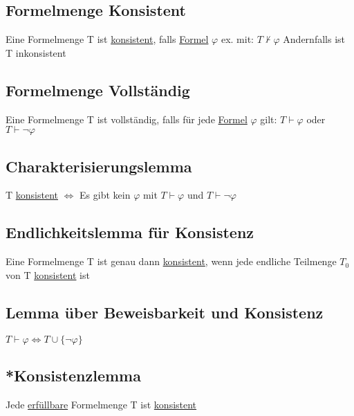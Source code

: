 \documentclass[12pt,a4paper]{article} %
\begin{document}
	\subsection{Formelmenge Konsistent}
	Eine Formelmenge T ist \hyperref[ALKonsistent]{konsistent}, falls \hyperref[Formel]{Formel} $\varphi$ ex. mit: $T \nvdash \varphi$ Andernfalls ist T inkonsistent
	
	\subsection{Formelmenge Vollständig}
	Eine Formelmenge T ist vollständig, falls für jede \hyperref[Formel]{Formel} $\varphi$ gilt: $T \hyperref[Beweisbar]{\vdash} \varphi$ oder $T \hyperref[Beweisbar]{\vdash} \neg \varphi$
	
	\subsection{Charakterisierungslemma}
	T \hyperref[ALKonsistent]{konsistent} $\Leftrightarrow$ Es gibt kein $\varphi$ mit $T \hyperref[Beweisbar]{\vdash} \varphi$ und $T \hyperref[Beweisbar]{\vdash} \neg \varphi$
	
	\subsection{Endlichkeitslemma für Konsistenz}
	Eine Formelmenge T ist genau dann \hyperref[ALKonsistent]{konsistent}, wenn jede endliche Teilmenge $T_0$ von T \hyperref[ALKonsistent]{konsistent} ist
	
	\subsection{Lemma über Beweisbarkeit und Konsistenz}
	$T \hyperref[Beweisbar]{\vdash} \varphi \Leftrightarrow T \cup \{\neg \varphi\}$
	
	\subsection{*Konsistenzlemma}
	Jede \hyperref[Erfullbar]{erfüllbare} Formelmenge T ist \hyperref[ALKonsistent]{konsistent}
\end{document}
